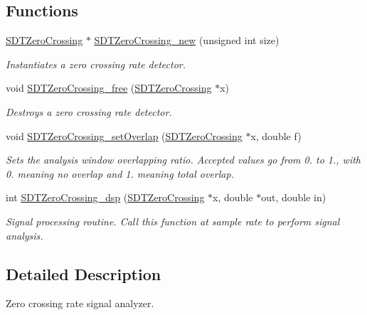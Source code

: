 \subsection*{Functions}
\begin{DoxyCompactItemize}
\item 
\hyperlink{group__zerocrossing_gae3cf5e0effced03712240753a4a60d06}{S\+D\+T\+Zero\+Crossing} $\ast$ \hyperlink{group__zerocrossing_gae165c64fd2e68870d362bdd541aacf28}{S\+D\+T\+Zero\+Crossing\+\_\+new} (unsigned int size)
\begin{DoxyCompactList}\small\item\em Instantiates a zero crossing rate detector. \end{DoxyCompactList}\item 
void \hyperlink{group__zerocrossing_gaa4bb5b8f8bdfaad702557c27369e3bc7}{S\+D\+T\+Zero\+Crossing\+\_\+free} (\hyperlink{group__zerocrossing_gae3cf5e0effced03712240753a4a60d06}{S\+D\+T\+Zero\+Crossing} $\ast$x)
\begin{DoxyCompactList}\small\item\em Destroys a zero crossing rate detector. \end{DoxyCompactList}\item 
void \hyperlink{group__zerocrossing_ga75cef03ffbd632a635904b577965851e}{S\+D\+T\+Zero\+Crossing\+\_\+set\+Overlap} (\hyperlink{group__zerocrossing_gae3cf5e0effced03712240753a4a60d06}{S\+D\+T\+Zero\+Crossing} $\ast$x, double f)
\begin{DoxyCompactList}\small\item\em Sets the analysis window overlapping ratio. Accepted values go from 0. to 1., with 0. meaning no overlap and 1. meaning total overlap. \end{DoxyCompactList}\item 
int \hyperlink{group__zerocrossing_ga22964baa5e5ba9a9d96ed374bf5f4a16}{S\+D\+T\+Zero\+Crossing\+\_\+dsp} (\hyperlink{group__zerocrossing_gae3cf5e0effced03712240753a4a60d06}{S\+D\+T\+Zero\+Crossing} $\ast$x, double $\ast$out, double in)
\begin{DoxyCompactList}\small\item\em Signal processing routine. Call this function at sample rate to perform signal analysis. \end{DoxyCompactList}\end{DoxyCompactItemize}


\subsection{Detailed Description}
Zero crossing rate signal analyzer. 


